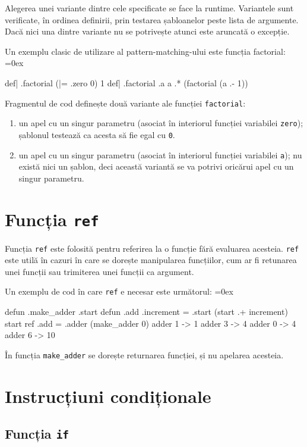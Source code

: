 \documentclass[12pt,a4paper]{memoir}
\renewcommand{\c}{\texttt}
\newenvironment{code}
{
\definecolor{shadecolor}{gray}{0.91}
\topsep=0ex
\relax
\shaded
\verbatim
}
{
\endverbatim
\endshaded
}
\begin{document}
Alegerea unei variante dintre cele specificate se face la runtime. Variantele sunt verificate, în ordinea definirii, prin testarea șabloanelor peste lista de argumente. Dacă nici una dintre variante nu se potrivește atunci este aruncată o excepție.

Un exemplu clasic de utilizare al pattern-matching-ului este funcția factorial:
\begin{code}
def| .factorial (|= .zero 0) { 1 }
def| .factorial .a { a .* (factorial (a .- 1)) }
\end{code}
Fragmentul de cod definește două variante ale funcției \c{factorial}:
\begin{enumerate}
\item un apel cu un singur parametru (asociat în interiorul funcției variabilei \c{zero}); șablonul testează ca acesta să fie egal cu \c{0}.
\item un apel cu un singur parametru (asociat în interiorul funcției variabilei \c{a}); nu există nici un șablon, deci această variantă se va potrivi oricărui apel cu un singur parametru.
\end{enumerate}

\section{Funcția \c{ref}}

Funcția \c{ref} este folosită pentru referirea la o funcție fără evaluarea acesteia. \c{ref} este utilă în cazuri în care se dorește manipularea funcțiilor, cum ar fi retunarea unei funcții sau trimiterea unei funcții ca argument. 

Un exemplu de cod în care \c{ref} e necesar este următorul:
\begin{code}
defun .make_adder .start {
  defun .add .increment {
    = .start (start .+ increment)
    start
  }
  ref .add
}
= .adder (make_adder 0)
adder 1 -> 1
adder 3 -> 4
adder 0 -> 4
adder 6 -> 10
\end{code}

În funcția \c{make\_adder} se dorește returnarea funcției, și nu apelarea acesteia.

\section{Instrucțiuni condiționale}

\subsection{Funcția \c{if}}
\end{document}
